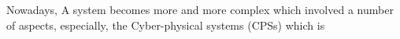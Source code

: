 Nowadays, A system becomes more and more complex which involved a number of aspects, especially, the Cyber-physical systems (CPSs) which is 




 
